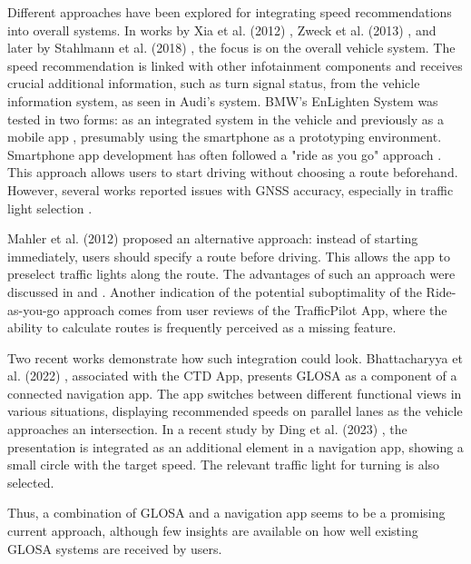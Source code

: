 Different approaches have been explored for integrating speed recommendations into overall systems. In works by Xia et al. (2012) \cite{xia_field_2012}, Zweck et al. (2013) \cite{zweck_traffic_2013}, and later by Stahlmann et al. (2018) \cite{stahlmann_exploring_2018}, the focus is on the overall vehicle system. The speed recommendation is linked with other infotainment components and receives crucial additional information, such as turn signal status, from the vehicle information system, as seen in Audi's system. BMW's EnLighten System was tested in two forms: as an integrated system in the vehicle \cite{sokolov_effects_2018} and previously as a mobile app \cite{wilson_driver_2017}, presumably using the smartphone as a prototyping environment. Smartphone app development has often followed a "ride as you go" approach \cite{otto_operating_2010, koukoumidis_signalguru_2011, koukoumidis_leveraging_2012, bernais_design_2016, wilson_driver_2017, zhang_green_2020, khan_eco-drive_2021, yunex_traffic_v2x-kommunikation_2023}. This approach allows users to start driving without choosing a route beforehand. However, several works reported issues with GNSS accuracy, especially in traffic light selection \cite{wilson_driver_2017, stahlmann_exploring_2018, bhattacharyya_assessing_2022}.

Mahler et al. (2012) \cite{mahler_reducing_2012} proposed an alternative approach: instead of starting immediately, users should specify a route before driving. This allows the app to preselect traffic lights along the route. The advantages of such an approach were discussed in  and . Another indication of the potential suboptimality of the Ride-as-you-go approach comes from user reviews of the TrafficPilot App, where the ability to calculate routes is frequently perceived as a missing feature.

Two recent works demonstrate how such integration could look. Bhattacharyya et al. (2022) \cite{bhattacharyya_assessing_2022}, associated with the CTD App, presents GLOSA as a component of a connected navigation app. The app switches between different functional views in various situations, displaying recommended speeds on parallel lanes as the vehicle approaches an intersection. In a recent study by Ding et al. (2023) \cite{ding_speedadv_2023}, the presentation is integrated as an additional element in a navigation app, showing a small circle with the target speed. The relevant traffic light for turning is also selected.

Thus, a combination of GLOSA and a navigation app seems to be a promising current approach, although few insights are available on how well existing GLOSA systems are received by users.

